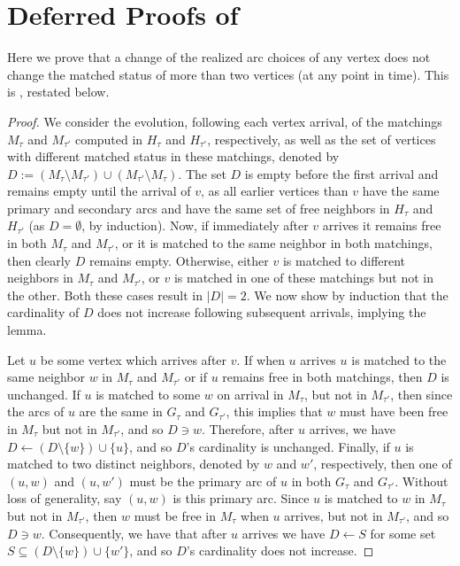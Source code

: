 \section{Deferred Proofs of }\label{app:imrpoved-algorithm}
Here we prove that a change of the realized arc choices of any vertex does not change the matched status of more than two vertices (at any point in time). This is , restated below.

\freevertices*
\begin{proof}
	We consider the evolution, following each vertex arrival, of the matchings $M_\tau$ and $M_{\tau'}$ computed in $H_\tau$ and $H_{\tau'}$, respectively, as well as the set of vertices with different matched status in these matchings, denoted by $D:=(M_{\tau} \setminus M_{\tau'})\cup (M_{\tau'} \setminus M_{\tau})$. 	
	The set $D$ is empty before the first arrival and remains empty until the arrival of $v$, as all earlier vertices than $v$ have the same primary and secondary arcs and have the same set of free neighbors in $H_\tau$ and $H_{\tau'}$ (as $D=\emptyset$, by induction). Now, if immediately after $v$ arrives it remains free in both $M_\tau$ and $M_{\tau'}$, or it is matched to the same neighbor in both matchings, then clearly $D$ remains empty. Otherwise, either $v$ is matched to different neighbors in $M_\tau$ and $M_{\tau'}$, or $v$ is matched in one of these matchings but not in the other. Both these cases result in $|D|=2$. We now show by induction that the cardinality of $D$ does not increase following subsequent arrivals, implying the lemma.
	
	Let $u$ be some vertex which arrives after $v$. 
	If when $u$ arrives $u$ is matched to the same neighbor $w$ in $M_\tau$ and $M_{\tau'}$ or if $u$ remains free in both matchings, then $D$ is unchanged.
	If $u$ is matched to some $w$ on arrival in $M_\tau$, but not in $M_{\tau'}$, then since the arcs of $u$ are the same in $G_\tau$ and $G_{\tau'}$, this implies that $w$ must have been free in $M_\tau$ but not in $M_{\tau'}$, and so $D\ni w$. Therefore, after $u$ arrives, we have $D \leftarrow (D\setminus \{w\}) \cup \{u\}$, and so $D$'s cardinality is unchanged.
	Finally, if $u$ is matched to two distinct neighbors, denoted by $w$ and $w'$, respectively, then one of $(u,w)$ and $(u,w')$ must be the primary arc of $u$ in both $G_\tau$ and $G_{\tau'}$. Without loss of generality, say $(u,w)$ is this primary arc. Since $u$ is matched to $w$ in $M_\tau$ but not in $M_{\tau'}$, then $w$ must be free in $M_\tau$ when $u$ arrives, but not in $M_{\tau'}$, and so $D\ni w$. Consequently, we have that after $u$ arrives we have $D \leftarrow S$ for some set $S \subseteq (D\setminus \{w\}) \cup \{w'\}$, and so $D$'s cardinality does not increase.
\end{proof}

